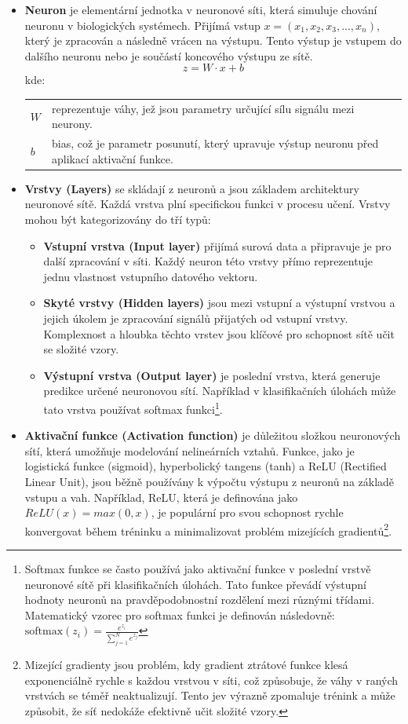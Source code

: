\documentclass[male,czech,api_ing]{thesis}
\makeatletter
\newenvironment{conditions}[1][kde:]
    {#1 \begin{tabular}[t]{>{$}l<{$} @{${}={}$} >{\raggedright\arraybackslash}p{10cm}}}
    {\end{tabular}}
\makeatother
\begin{document}
\begin{itemize}
    \item \textbf{Neuron} je elementární jednotka v neuronové síti, která simuluje chování neuronu v biologických systémech. Přijímá vstup $x = (x_1, x_2, x_3, ..., x_n)$, který je zpracován a následně vrácen na výstupu. Tento výstup je vstupem do dalšího neuronu nebo je součástí koncového výstupu ze sítě.
        \begin{equation}
            z = W \cdot x + b
        \end{equation}
        \begin{conditions}
            W & reprezentuje váhy, jež jsou parametry určující sílu signálu mezi neurony. \\
            b & bias, což je parametr posunutí, který upravuje výstup neuronu před aplikací aktivační funkce.
        \end{conditions}
    \item \textbf{Vrstvy (Layers)} se skládají z neuronů a jsou základem architektury neuronové sítě. Každá vrstva plní specifickou funkci v procesu učení. Vrstvy mohou být kategorizovány do tří typů:
        \begin{itemize}
            \item \textbf{Vstupní vrstva (Input layer)} přijímá surová data a připravuje je pro další zpracování v síti. Každý neuron této vrstvy přímo reprezentuje jednu vlastnost vstupního datového vektoru.
            \item \textbf{Skyté vrstvy (Hidden layers)} jsou mezi vstupní a výstupní vrstvou a jejich úkolem je zpracování signálů přijatých od vstupní vrstvy. Komplexnost a hloubka těchto vrstev jsou klíčové pro schopnost sítě učit se složité vzory.
            \item \textbf{Výstupní vrstva (Output layer) } je poslední vrstva, která generuje predikce určené neuronovou sítí. Například v klasifikačních úlohách může tato vrstva používat softmax funkci\footnote{Softmax funkce se často používá jako aktivační funkce v poslední vrstvě neuronové sítě při klasifikačních úlohách. Tato funkce převádí výstupní hodnoty neuronů na pravděpodobnostní rozdělení mezi různými třídami. Matematický vzorec pro softmax funkci je definován následovně: $\text{softmax}(z_i) = \frac{e^{z_i}}{\sum_{j=1}^{N} e^{z_j}}$}.
        \end{itemize}
    \item \textbf{Aktivační funkce (Activation function)} je důležitou složkou neuronových sítí, která umožňuje modelování nelineárních vztahů. Funkce, jako je logistická funkce (sigmoid), hyperbolický tangens (tanh) a ReLU (Rectified Linear Unit), jsou běžně používány k výpočtu výstupu z neuronů na základě vstupu a vah. Například, ReLU, která je definována jako $ReLU(x) = max(0, x)$, je populární pro svou schopnost rychle konvergovat během tréninku a minimalizovat problém mizejících gradientů\footnote{Mizející gradienty jsou problém, kdy gradient ztrátové funkce klesá exponenciálně rychle s každou vrstvou v síti, což způsobuje, že váhy v raných vrstvách se téměř neaktualizují. Tento jev výrazně zpomaluje trénink a může způsobit, že síť nedokáže efektivně učit složité vzory.}.

\end{itemize}
\end{document}
